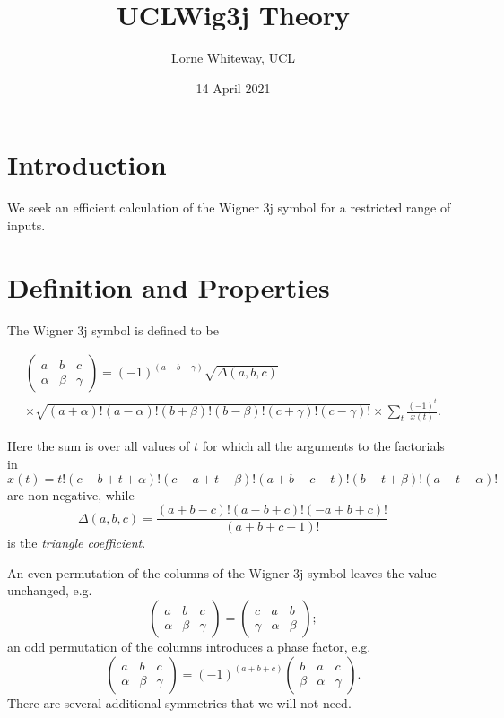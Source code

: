 \documentclass[11pt]{article}
\title{UCLWig3j Theory}
\author{Lorne Whiteway, UCL}
\date{14 April 2021}
\newcommand{\symthreejarray}[6]{{\left( \begin{array}{ccc} #1 & #2 & #3 \\ #4 & #5 & #6 \end{array} \right)} }
\begin{document}
\maketitle

\section{Introduction}

We seek an efficient calculation of the Wigner 3j symbol for a restricted range of inputs.

\section{Definition and Properties}

The Wigner 3j symbol is defined to be

\begin{multline}
\label{eq_symthreejarray_definition}
\symthreejarray{a}{b}{c}{\alpha}{\beta}{\gamma} = (-1)^{(a-b-\gamma)} \sqrt{\Delta(a,b,c)} \\
\times \sqrt{(a + \alpha)! (a - \alpha)! (b + \beta)! (b - \beta)! (c + \gamma)! (c - \gamma)!}  \times \sum_{t}{\frac{(-1)^t}{x(t)}}.
\end{multline}

\noindent Here the sum is over all values of $t$ for which all the arguments to the factorials in
\begin{equation}
x(t) = t! (c-b+t+\alpha)! (c-a+t-\beta)! (a+b-c-t)! (b-t+\beta)! (a-t-\alpha)!
\end{equation}
are non-negative, while
\begin{equation}
\Delta(a,b,c) = \frac{(a+b-c)! (a-b+c)! (-a+b+c)!}{(a+b+c+1)!}
\end{equation}
is the \textit{triangle coefficient}.

An even permutation of the columns of the Wigner 3j symbol leaves the value unchanged, e.g.
\begin{equation}
\label{eq_even_symmetry}
\symthreejarray{a}{b}{c}{\alpha}{\beta}{\gamma} = \symthreejarray{c}{a}{b}{\gamma}{\alpha}{\beta};
\end{equation}
an odd permutation of the columns introduces a phase factor, e.g.
\begin{equation}
\label{eq_odd_symmetry}
\symthreejarray{a}{b}{c}{\alpha}{\beta}{\gamma} = (-1)^{(a+b+c)}\symthreejarray{b}{a}{c}{\beta}{\alpha}{\gamma}.
\end{equation}
There are several additional symmetries that we will not need.
\end{document}
